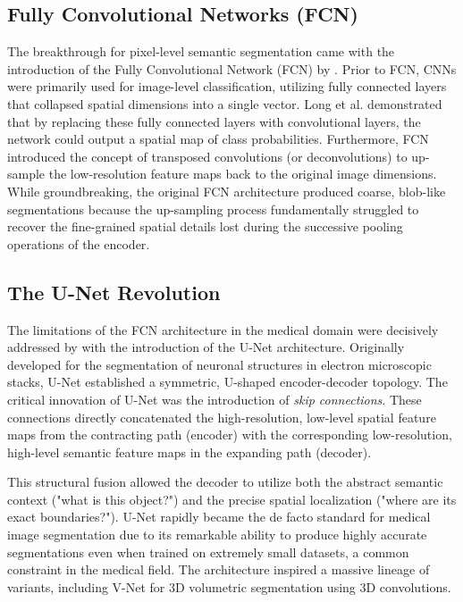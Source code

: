 \subsection{Fully Convolutional Networks (FCN)}
The breakthrough for pixel-level semantic segmentation came with the introduction of the Fully Convolutional Network (FCN) by \textcite{long2015fully}. Prior to FCN, CNNs were primarily used for image-level classification, utilizing fully connected layers that collapsed spatial dimensions into a single vector. Long et al. demonstrated that by replacing these fully connected layers with convolutional layers, the network could output a spatial map of class probabilities. Furthermore, FCN introduced the concept of transposed convolutions (or deconvolutions) to up-sample the low-resolution feature maps back to the original image dimensions. While groundbreaking, the original FCN architecture produced coarse, blob-like segmentations because the up-sampling process fundamentally struggled to recover the fine-grained spatial details lost during the successive pooling operations of the encoder.

\subsection{The U-Net Revolution}
The limitations of the FCN architecture in the medical domain were decisively addressed by \textcite{ronneberger2015u} with the introduction of the U-Net architecture. Originally developed for the segmentation of neuronal structures in electron microscopic stacks, U-Net established a symmetric, U-shaped encoder-decoder topology. The critical innovation of U-Net was the introduction of \textit{skip connections}. These connections directly concatenated the high-resolution, low-level spatial feature maps from the contracting path (encoder) with the corresponding low-resolution, high-level semantic feature maps in the expanding path (decoder). 

This structural fusion allowed the decoder to utilize both the abstract semantic context ("what is this object?") and the precise spatial localization ("where are its exact boundaries?"). U-Net rapidly became the de facto standard for medical image segmentation due to its remarkable ability to produce highly accurate segmentations even when trained on extremely small datasets, a common constraint in the medical field. The architecture inspired a massive lineage of variants, including V-Net \parencite{milletari2016v} for 3D volumetric segmentation using 3D convolutions.

